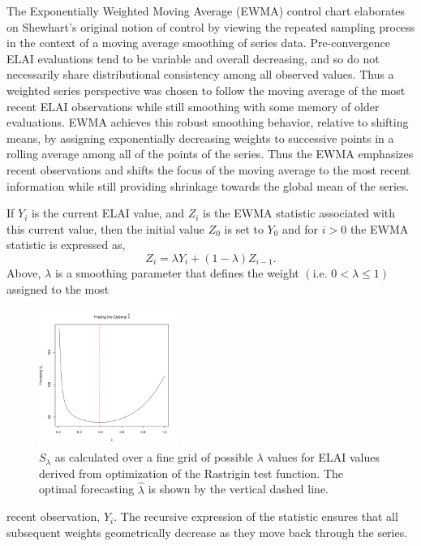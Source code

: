 \documentclass[12pt]{article}
\begin{document}
%
The Exponentially Weighted Moving Average (EWMA) control chart \citep{ewmaPaper, qccPack} elaborates on Shewhart's original notion of control by viewing the repeated sampling process in the context of a moving average smoothing of series data. %
Pre-convergence ELAI evaluations tend to be variable and overall decreasing, and so do not necessarily share distributional consistency among all observed values.  
%
Thus a weighted series perspective was chosen to follow the moving average of the most recent ELAI observations while still smoothing with some memory of older evaluations.
%
EWMA achieves this robust smoothing behavior, relative to shifting means, by assigning exponentially decreasing weights to successive points in a rolling average among all of the points of the series. Thus the EWMA emphasizes recent observations and shifts the focus of the moving average to the most recent information while still providing shrinkage towards the global mean of the series.

%
%

%
If $Y_i$ is the current ELAI value, and $Z_i$ is the EWMA statistic associated with this current value, then the initial value $Z_0$ is set to $Y_0$ and for $i>0$ the EWMA statistic is expressed as,
%
\begin{equation}
Z_i=\lambda Y_i+(1-\lambda)Z_{i-1}.
\label{ewmaStat}
\end{equation}
%
Above, $\lambda$ is a smoothing parameter that defines the weight $\left( \text{i.e. }0<\lambda\le1\right)$ assigned to the most 
%
%
\begin{figure}
\vspace{-0.8cm}
\includegraphics[width=0.4\textwidth]{./figures/ssRastHardOpt.pdf}
\caption{ $S_\lambda$ as calculated over a fine grid of possible $\lambda$ values for ELAI values derived from optimization of the Rastrigin test function. The optimal forecasting $\hat\lambda$ is shown by the vertical dashed line. }
\label{bestL}
\end{figure}
%
%
recent observation, $Y_i$.
The recursive expression of the statistic ensures that all subsequent weights geometrically decrease as they move back through the series.
\end{document}
